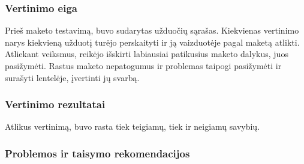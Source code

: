 	\subsubsection{Vertinimo eiga}

	Prieš maketo testavimą, buvo sudarytas užduočių sąrašas.
	Kiekvienas vertinimo narys kiekvieną užduotį turėjo perskaityti ir ją vaizduotėje pagal maketą atlikti.
	Atliekant veiksmus, reikėjo išskirti labiausiai patikusius maketo dalykus, juos pasižymėti.
	Rastus maketo nepatogumus ir problemas taipogi pasižymėti ir surašyti lentelėje, įvertinti jų svarbą.

	\newpage

	\subsubsection{Vertinimo rezultatai}

	Atlikus vertinimą, buvo rasta tiek teigiamų, tiek ir neigiamų savybių.

	\subsubsection{Problemos ir taisymo rekomendacijos}
	
